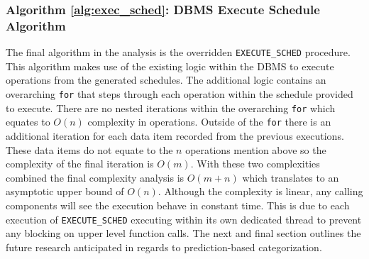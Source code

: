 \documentclass[conference]{IEEEtran}
\begin{document}

\subsubsection{Algorithm \ref{alg:exec_sched}: DBMS Execute Schedule Algorithm}
\label{alg_complexity:exec_sched}
The final algorithm in the analysis is the overridden \verb|EXECUTE_SCHED| procedure. This algorithm makes use of the existing logic within the DBMS to execute operations from the generated schedules. The additional logic contains an overarching \verb|for| that steps through each operation within the schedule provided to execute. There are no nested iterations within the overarching \verb|for| which equates to $O(n)$ complexity in operations. Outside of the \verb|for| there is an additional iteration for each data item recorded from the previous executions. These data items do not equate to the $n$ operations mention above so the complexity of the final iteration is $O(m)$. With these two complexities combined the final complexity analysis is $O(m+n)$ which translates to an asymptotic upper bound of $O(n)$. Although the complexity is linear, any calling components will see the execution behave in constant time. This is due to each execution of \verb|EXECUTE_SCHED| executing within its own dedicated thread to prevent any blocking on upper level function calls. The next and final section outlines the future research anticipated in regards to prediction-based categorization.
\end{document}
